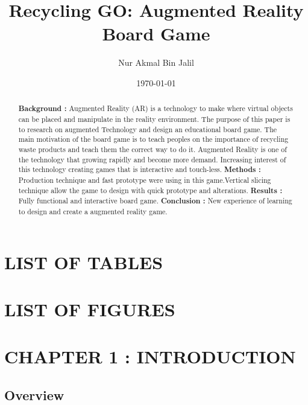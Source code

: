 \documentclass[12pt]{article}
\title{Recycling GO: Augmented Reality Board Game}
\author{Nur Akmal Bin Jalil }
\date{\today}
\begin{document}
\maketitle
\pagebreak

\begin{abstract}

\noindent\textbf{Background : }Augmented Reality (AR) is a technology to make where virtual objects can be placed and manipulate in the reality environment. The purpose of this paper is to research on augmented Technology and design an educational board game. The main motivation of the board game is to teach peoples on the importance of recycling waste products and teach them the correct way to do it. Augmented Reality is one of the technology that growing rapidly and become more demand. Increasing interest of this technology creating games that is interactive and touch-less.  
\newline \textbf{Methods : }Production technique and fast prototype were using in this game.Vertical slicing technique allow the game to design with quick prototype and alterations.
\newline \textbf{Results : }Fully functional and interactive board game. 
\newline \textbf{Conclusion : }New experience of learning to design and create a augmented reality game.
\end{abstract}

\pagebreak

\tableofcontents

\pagebreak

\section*{LIST OF TABLES}

\pagebreak

\section*{LIST OF FIGURES}

\pagebreak

\section{CHAPTER 1 : INTRODUCTION}

\subsection{Overview}
\end{document}
